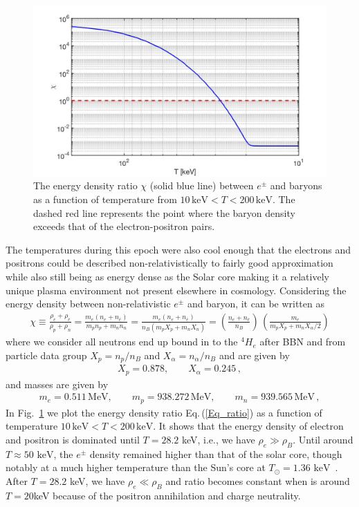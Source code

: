 \documentclass[universe,article,submit,moreauthors,pdftex,a4paper]{Definitions/mdpi}
\newcommand{\keV}{\text{ keV}}
\newcommand{\req}[1]{Eq.\,(\ref{#1})}
\newcommand*{\rf}[1]{Fig.~{\ref{#1}}}
\begin{document}
\begin{figure}[ht]
\centerline{\includegraphics[width=\textwidth]{./plots/EnergyDensityRatio002.jpg}}
\caption{The energy density ratio $\chi$ (solid blue line) between $e^{\pm}$ and baryons as a function of temperature from $10\,\mathrm{keV}< T<200\,\mathrm{keV}$. The dashed red line represents the point where the baryon density exceeds that of the electron-positron pairs.}
\label{ratio_fig} 
\end{figure}

The temperatures during this epoch were also cool enough that the electrons and positrons could be described non-relativistically to fairly good approximation while also still being as energy dense as the Solar core making it a relatively unique plasma environment not present elsewhere in cosmology. Considering the energy density between non-relativistic $e^{\pm}$ and baryon, it can be written as
\begin{align}\label{Eq_ratio}
\chi\equiv\frac{\rho_e+\rho_{\bar e}}{\rho_p+\rho_n}=\frac{m_e(n_e+n_{\bar e})}{m_pn_p+m_n n_n}=\frac{m_e(n_e+n_{\bar e})}{n_B(m_pX_p+m_nX_n)}=\left(\frac{n_e+n_{\bar e}}{n_B}\right)\,\left(\frac{m_e}{m_pX_p+{m_n X_\alpha}/2}\right)
\end{align}
where we consider all neutrons end up bound in to the $^4H_e$ after BBN and from particle data group $X_p=n_p/n_B$ and $X_\alpha=n_\alpha/n_B$ and are given by~\cite{ParticleDataGroup:2022pth}
\begin{align}
X_p=0.878,\qquad X_\alpha=0.245\,,
\end{align}
and masses are given by
\begin{align}
m_e=0.511\,\mathrm{MeV}, \qquad m_p=938.272\,\mathrm{MeV},\qquad m_n=939.565\,\mathrm{MeV}\,,
\end{align}
In \rf{ratio_fig} we plot the energy density ratio \req{Eq_ratio} as a function of temperature $10\,\mathrm{keV}< T<200\,\mathrm{keV}$. It shows that the energy density of electron and positron is dominated until $T=28.2$ keV, i.e., we have $\rho_{e}\gg\rho_B$. Until around $T\approx50\keV$, the $e^{\pm}$ density remained higher than that of the solar core, though notably at a much higher temperature than the Sun's core at $T_{\odot}=1.36\keV$~\cite{Castellani:1996cm}. After $T=28.2$ keV, we have $\rho_{e}\ll\rho_B$ and ratio becomes constant when is around $T=20$keV because of the positron annihilation and charge neutrality.
\end{document}
